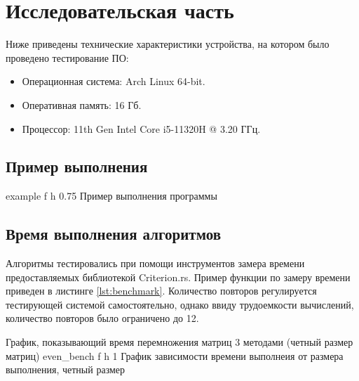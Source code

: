 \chapter{Исследовательская часть}
Ниже приведены технические характеристики устройства, на котором было проведено тестирование ПО:

\begin{itemize}
    \item Операционная система: Arch Linux \cite{arch} 64-bit.
    \item Оперативная память: 16 Гб.
    \item Процессор: 11th Gen Intel\textsuperscript{\tiny\textregistered} Core\textsuperscript{\tiny\texttrademark} i5-11320H @ 3.20 ГГц\cite{i5}.
\end{itemize}

\section{Пример выполнения}
{example} %
{f} %
{h} %
{0.75\textwidth} %
{Пример выполнения программы} %
\clearpage

\section{Время выполнения алгоритмов}
Алгоритмы тестировались при помощи инструментов замера времени предоставляемых библиотекой Criterion.rs\cite{Criterion}.
Пример функции по замеру времени приведен в листинге \ref{lst:benchmark}.
Количество повторов регулируется тестирующей системой самостоятельно, однако ввиду трудоемкости вычислений, количество повторов было ограничено до 12.


\newpage
График, показывающий время перемножения матриц 3 методами (четный размер матриц)\newline
{even_bench} %
{f} %
{h} %
{1\textwidth} %
{График зависимости времени выполнеия от размера выполнения, четный размер} %
\newpage

